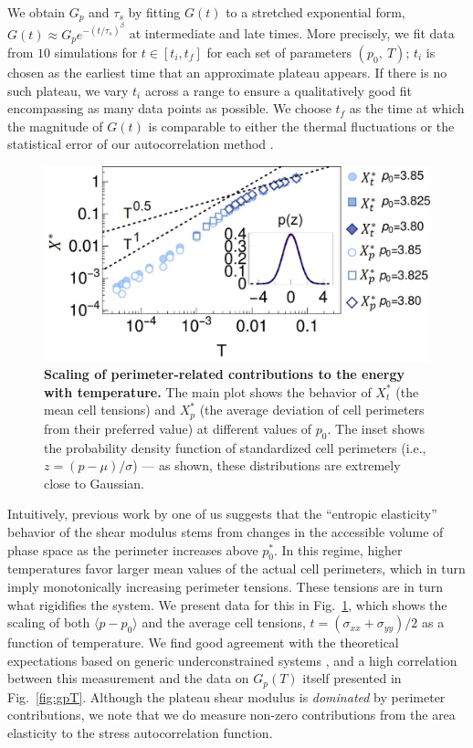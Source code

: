 \documentclass[aps,reprint,superscriptaddress,nofootinbib, notitlepage,prl]{revtex4-2}
\begin{document}
We obtain $G_p$ and $\tau_s$ by fitting $G(t)$ to a stretched exponential form, $G(t)\approx G_p e^{-(t/\tau_s)^\beta}$ at intermediate and late times.
More precisely, we fit data from $10$ simulations for $t\in \left[t_i,t_f\right]$ for each set of parameters $(p_0,\ T)$; $t_i$ is chosen as the earliest time that an approximate plateau appears. If there is no such plateau, we vary $t_i$ across a range to ensure a qualitatively good fit encompassing as many data points as possible. We choose $t_f$ as the time at which the magnitude of $G(t)$ is comparable to either the thermal fluctuations or the statistical error of our autocorrelation method \cite{ramirez2010efficient}.

\begin{figure}
	\centering
    \includegraphics[width=1\linewidth]{endMatter_tension.jpg}
	\caption{\textbf{Scaling of perimeter-related contributions to the energy with temperature.}
        The main plot shows the behavior of $X_t^\ast$ (the mean cell tensions) and $X_p^\ast$ (the average deviation of cell perimeters from their preferred value) at different values of $p_0$.
        The inset shows the probability density function of standardized cell perimeters (i.e., $z=(p-\mu)/\sigma$) --- as shown, these distributions are extremely close to Gaussian.
	}
    \label{fig:tension}
\end{figure}

Intuitively, previous work by one of us suggests that the ``entropic elasticity'' behavior of the shear modulus stems from changes in the accessible volume of phase space as the perimeter increases above $p_0^\ast$. In this regime, higher temperatures favor larger mean values of the actual cell perimeters, which in turn imply monotonically increasing perimeter tensions.
These tensions are in turn what rigidifies the system.
We present data for this in Fig.~\ref{fig:tension}, which shows the scaling of both $\langle p-p_0\rangle$ and the average cell tensions, $t=(\sigma_{xx}+\sigma_{yy})/2$ as a function of temperature.
We find good agreement with the theoretical expectations based on generic underconstrained systems \cite{lee2023generic,lee2023partition}, and a high correlation between this measurement and the data on $G_p(T)$ itself presented in Fig.~\ref{fig:gpT}.
Although the plateau shear modulus is \emph{dominated} by perimeter contributions, we note that we do measure non-zero contributions from the area elasticity to the stress autocorrelation function.
\end{document}
